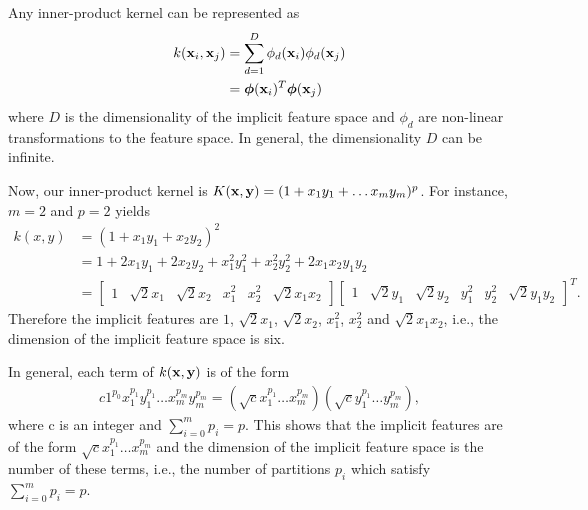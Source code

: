 \begin{enumerate}
  \begin{solution}

    Any inner-product kernel can be represented as
    \begin{align*}
      k(\mathbf{x}_i,\mathbf{x}_j) &= \sum_{d=1}^D \phi_d(\mathbf{x}_i) \phi_d(\mathbf{x}_j)
      \\
      &= \boldsymbol{\phi}(\mathbf{x}_i)^T \boldsymbol{\phi}(\mathbf{x}_j)
    \end{align*}
    where $D$ is the dimensionality of the implicit feature space and
    $\phi_d$ are non-linear transformations to the feature space.  In
    general, the dimensionality $D$ can be infinite.

    Now, our inner-product kernel is $K(\mathbf{x}, \mathbf{y}) = (1 + x_1 y_1 +
    \ldots x_m y_m)^p$.  For instance, $m=2$ and $p=2$ yields
    \begin{align*}
      k(x, y) &= (1 + x_1y_1 + x_2y_2)^2
      \\
      &= 1 + 2x_1y_1 + 2x_2y_2 + x_1^2y_1^2 + x_2^2y_2^2 +
      2x_1x_2y_1y_2
      \\
      &=
      \begin{bmatrix}
        1 & \sqrt{2}x_1 & \sqrt{2}x_2 & x_1^2 & x_2^2 & \sqrt{2}x_1
        x_2
      \end{bmatrix}
      \begin{bmatrix}
        1 & \sqrt{2}y_1 & \sqrt{2}y_2 & y_1^2 & y_2^2 & \sqrt{2}y_1
        y_2
      \end{bmatrix}^T .
    \end{align*}
    Therefore the implicit features are $1$, $\sqrt{2}x_1$,
    $\sqrt{2}x_2$, $x_1^2$, $x_2^2$ and $\sqrt{2}x_1 x_2$, i.e., the
    dimension of the implicit feature space is six.

    In general, each term of $k(\mathbf{x}, \mathbf{y})$ is of the form
    \begin{align*}
      c 1^{p_0} x_1^{p_1} y_1^{p_1} \ldots x_m^{p_m} y_m^{p_m} =
      (\sqrt{c} x_1^{p_1} \ldots x_m^{p_m})(\sqrt{c} y_1^{p_1} \ldots
      y_m^{p_m}),
    \end{align*}
    where c is an integer and $\sum_{i=0}^m p_i = p$.  This shows that
    the implicit features are of the form $\sqrt{c} x_1^{p_1} \ldots
    x_m^{p_m}$ and the dimension of the implicit feature space is the
    number of these terms, i.e., the number of partitions $p_i$ which
    satisfy $\sum_{i=0}^m p_i = p$.


\end{solution}
\end{enumerate}
